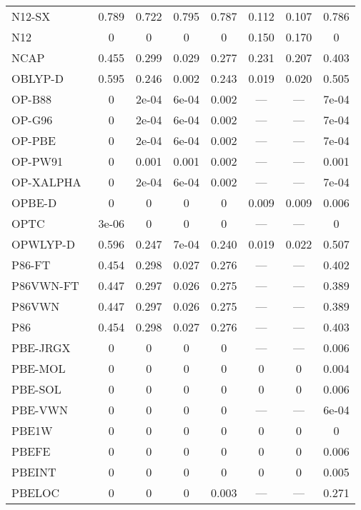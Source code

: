 \begin{table*}
\begin{tabular}{|l|c|c|c|c|c|c|c|}
N12-SX~\cite{Peverati2012_16187} & 0.789 & 0.722 & 0.795 & 0.787 & 0.112 & 0.107 & 0.786 \\
N12~\cite{Peverati2012_2310} & 0 & 0 & 0 & 0 & 0.150 & 0.170 & 0 \\
NCAP~\cite{Carmona2019_303} & 0.455 & 0.299 & 0.029 & 0.277 & 0.231 & 0.207 & 0.403 \\
OBLYP-D~\cite{Goerigk2010_107} & 0.595 & 0.246 & 0.002 & 0.243 & 0.019 & 0.020 & 0.505 \\
OP-B88~\cite{Tsuneda1999_10664} & 0 & 2e-04 & 6e-04 & 0.002 & --- & --- & 7e-04 \\
OP-G96~\cite{Tsuneda1999_10664,Tsuneda1999_5656} & 0 & 2e-04 & 6e-04 & 0.002 & --- & --- & 7e-04 \\
OP-PBE~\cite{Tsuneda1999_10664,Tsuneda1999_5656} & 0 & 2e-04 & 6e-04 & 0.002 & --- & --- & 7e-04 \\
OP-PW91~\cite{Tsuneda1999_10664,Tsuneda1999_5656} & 0 & 0.001 & 0.001 & 0.002 & --- & --- & 0.001 \\
OP-XALPHA~\cite{Tsuneda1999_10664,Tsuneda1999_5656} & 0 & 2e-04 & 6e-04 & 0.002 & --- & --- & 7e-04 \\
OPBE-D~\cite{Goerigk2010_107} & 0 & 0 & 0 & 0 & 0.009 & 0.009 & 0.006 \\
OPTC~\cite{Cohen2001_607} & 3e-06 & 0 & 0 & 0 & --- & --- & 0 \\
OPWLYP-D~\cite{Goerigk2010_107} & 0.596 & 0.247 & 7e-04 & 0.240 & 0.019 & 0.022 & 0.507 \\
P86-FT~\cite{Perdew1986_8822} & 0.454 & 0.298 & 0.027 & 0.276 & --- & --- & 0.402 \\
P86VWN-FT~\cite{Perdew1986_8822} & 0.447 & 0.297 & 0.026 & 0.275 & --- & --- & 0.389 \\
P86VWN~\cite{Perdew1986_8822} & 0.447 & 0.297 & 0.026 & 0.275 & --- & --- & 0.389 \\
P86~\cite{Perdew1986_8822} & 0.454 & 0.298 & 0.027 & 0.276 & --- & --- & 0.403 \\
PBE-JRGX~\cite{Pedroza2009_201106} & 0 & 0 & 0 & 0 & --- & --- & 0.006 \\
PBE-MOL~\cite{delCampo2012_104108} & 0 & 0 & 0 & 0 & 0 & 0 & 0.004 \\
PBE-SOL~\cite{Perdew2008_136406} & 0 & 0 & 0 & 0 & 0 & 0 & 0.006 \\
PBE-VWN~\cite{Kraisler2010_042516,Perdew1996_3865,Perdew1996_3865_err} & 0 & 0 & 0 & 0 & --- & --- & 6e-04 \\
PBE1W~\cite{Dahlke2005_15677} & 0 & 0 & 0 & 0 & 0 & 0 & 0 \\
PBEFE~\cite{Perez2015_3844} & 0 & 0 & 0 & 0 & 0 & 0 & 0.006 \\
PBEINT~\cite{Fabiano2010_113104} & 0 & 0 & 0 & 0 & 0 & 0 & 0.005 \\
PBELOC~\cite{Constantin2012_035130} & 0 & 0 & 0 & 0.003 & --- & --- & 0.271 \\
\bottomrule
\end{tabular}
\end{table*}
